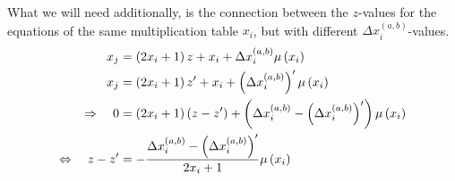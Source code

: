 What we will need additionally, is the connection between the $z$-values for the equations of the same multiplication table $x_{i}$, but with different $\Delta x_{i}^{\left(a,b\right)}$-values.
\begin{alignat}{3}
	x_{j} &= \left(2x_{i} + 1\right)z + x_{i} + \Delta x_{i}^{\left(a,b\right)}\mu\left(x_{i}\right) \notag \\
	x_{j} &= \left(2x_{i} + 1\right)z^{\prime} + x_{i} + \left(\Delta x_{i}^{\left(a,b\right)}\right)^{\prime}\mu\left(x_{i}\right) \notag \\ 
	\Rightarrow \quad 0 &= \left(2x_{i} + 1\right)\left(z - z^{\prime}\right) + \left(\Delta x_{i}^{\left(a,b\right)} - \left(\Delta x_{i}^{\left(a,b\right)}\right)^{\prime}\right)\mu\left(x_{i}\right) \notag \\
	\Leftrightarrow \quad z - z^{\prime} &= - \frac{\Delta x_{i}^{\left(a,b\right)} - \left(\Delta x_{i}^{\left(a,b\right)}\right)^{\prime}}{2x_{i} + 1} \mu\left(x_{i}\right) \label{eq:differentDeltaxforsamexi}
\end{alignat}


















